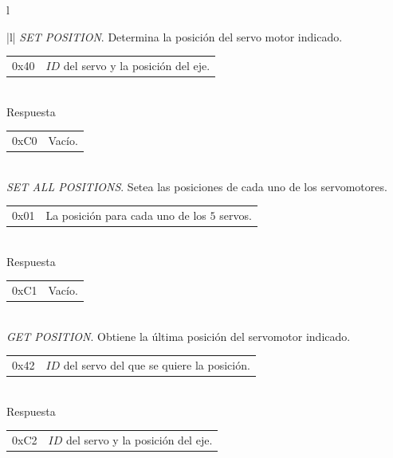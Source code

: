 \begin{table}
	\begin{center}
		\begin{tabular}{l}
			\begin{tabular}{|l|}
				\hline
				\emph{SET POSITION}. Determina la posici\'on del servo motor indicado. \\
				\hline
				\begin{tabular}{c|l}
					0x40 & $ID$ del servo y la posici\'on del eje. \\
				\end{tabular}
				\\
				\hline
				Respuesta \\
				\hline
				\begin{tabular}{c|l}
					0xC0 & Vac\'io. \\
				\end{tabular}
				\\
	
				\hline\hline
				\emph{SET ALL POSITIONS}. Setea las posiciones de cada uno de los servomotores. \\
				\hline
				\begin{tabular}{c|l}
					0x01 & La posici\'on para cada uno de los $5$ servos.\\
				\end{tabular}
				\\
				\hline
				Respuesta \\
				\hline
				\begin{tabular}{c|l}
					0xC1 & Vac\'io. \\
				\end{tabular}
				\\
	
				\hline\hline
				\emph{GET POSITION}. Obtiene la \'ultima posici\'on del servomotor indicado. \\
				\hline
				\begin{tabular}{c|l}
					0x42 & $ID$ del servo del que se quiere la posici\'on. \\
				\end{tabular}
				\\
				\hline
				Respuesta \\
				\hline
				\begin{tabular}{c|l}
					0xC2 & $ID$ del servo y la posici\'on del eje. \\
				\end{tabular}
				\\
	

\end{tabular}
\end{tabular}
\end{center}
\end{table}
